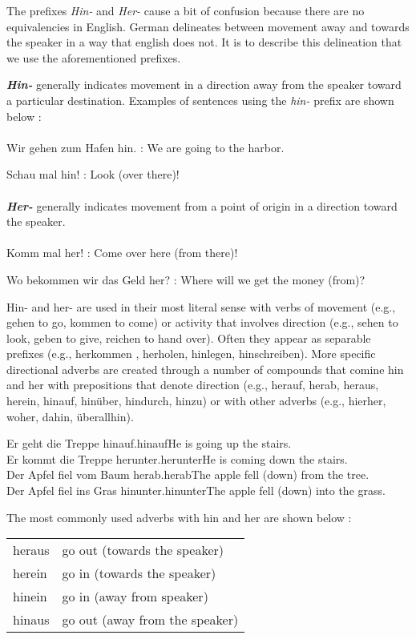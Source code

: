 \documentclass[a4paper,twocolumn,10pt]{article}
\newcommand{\newpar}
{\par \vspace{0.3cm}}
\newcommand{\tabularxtable}[3]
{

	\vspace{0.5cm}
	\nolinenumbers

	\begin{tabularx}{#1}{#2}
		#3
	\end{tabularx}

	\linenumbers
	\vspace{0.5cm}
}
\begin{document}
The prefixes \textit{Hin- }and \textit{Her-} cause a bit of confusion because
there are no equivalencies in English. German delineates between movement away
and towards the speaker in a way that english does not. It is to describe this
delineation that we use the aforementioned prefixes.\newpar

\textbf{\textit{Hin-}} generally indicates movement in a direction away from the speaker toward a
particular destination. Examples of sentences using the \textit{hin-} prefix are
shown below :
\\\\
\noindent
Wir gehen zum Hafen hin. : We are going to the harbor.\newpar
Schau mal hin!           : Look (over there)!
\\\\
\textbf{\textit{Her-}} generally indicates movement from a point of origin in a direction toward
the speaker.
\\\\
\noindent
Komm mal her!                 : Come over here (from there)!\newpar
Wo bekommen wir das Geld her? : Where will we get the money (from)?

Hin- and her- are used in their most literal sense with verbs of movement (e.g.,
gehen to go, kommen to come) or activity that involves direction (e.g., sehen to
look, geben to give, reichen to hand over). Often they appear as separable
prefixes (e.g., herkommen , herholen, hinlegen, hinschreiben). More specific
directional adverbs are created through a number of compounds that comine hin
and her with prepositions that denote direction (e.g., herauf, herab, heraus,
herein, hinauf, hinüber, hindurch, hinzu) or with other adverbs (e.g., hierher,
woher, dahin, überallhin).\newpar

\noindent
Er geht die Treppe hinauf.hinaufHe is going up the stairs.\\
Er kommt die Treppe herunter.herunterHe is coming down the stairs.\\
Der Apfel fiel vom Baum herab.herabThe apple fell (down) from the tree.\\
Der Apfel fiel ins Gras hinunter.hinunterThe apple fell (down) into the grass.
\newpar
\noindent
The most commonly used adverbs with hin and her are shown below :



\tabularxtable
{0.95\linewidth}
{lX}
{
\rowcolor{white}     heraus & go out (towards the speaker) \\
\rowcolor{lightgray} herein & go in (towards the speaker)\\
\rowcolor{white}     hinein & go in (away from speaker)\\
\rowcolor{lightgray} hinaus & go out (away from the speaker) \\


}
\end{document}
